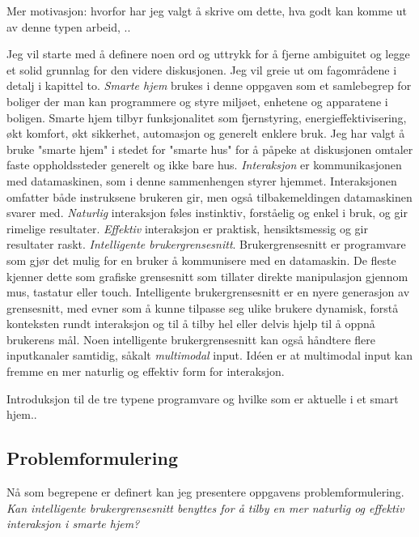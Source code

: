 {\color{red}Mer motivasjon: hvorfor har jeg valgt å skrive om dette, hva godt kan komme ut av denne typen arbeid, ..}

Jeg vil starte med å definere noen ord og uttrykk for å fjerne ambiguitet og legge et solid grunnlag for den videre diskusjonen. Jeg vil greie ut om fagområdene i detalj i kapittel to.
\newline\newline
\emph{Smarte hjem} brukes i denne oppgaven som et samlebegrep for boliger der man kan programmere og styre miljøet, enhetene og apparatene i boligen. Smarte hjem tilbyr funksjonalitet som fjernstyring, energieffektivisering, økt komfort, økt sikkerhet, automasjon og generelt enklere bruk. Jeg har valgt å bruke "smarte hjem" i stedet for "smarte hus" for å påpeke at diskusjonen omtaler faste oppholdssteder generelt og ikke bare hus. 
\newline\newline
\emph{Interaksjon} er kommunikasjonen med datamaskinen, som i denne sammenhengen styrer hjemmet. Interaksjonen omfatter både instruksene brukeren gir, men også tilbakemeldingen datamaskinen svarer med.
\newline\newline
\emph{Naturlig} interaksjon føles instinktiv, forståelig og enkel i bruk, og gir rimelige resultater.
\newline\newline
\emph{Effektiv} interaksjon er praktisk, hensiktsmessig og gir resultater raskt.
\newline\newline
\emph{Intelligente brukergrensesnitt}. Brukergrensesnitt er programvare som gjør det mulig for en bruker å kommunisere med en datamaskin. De fleste kjenner dette som grafiske grensesnitt som tillater direkte manipulasjon gjennom mus, tastatur eller touch. Intelligente brukergrensesnitt er en nyere generasjon av grensesnitt, med evner som å kunne tilpasse seg ulike brukere dynamisk, forstå konteksten rundt interaksjon og til å tilby hel eller delvis hjelp til å oppnå brukerens mål. Noen intelligente brukergrensesnitt kan også håndtere flere inputkanaler samtidig, såkalt \emph{multimodal} input. Idéen er at multimodal input kan fremme en mer naturlig og effektiv form for interaksjon.

{\color{red}Introduksjon til de tre typene programvare og hvilke som er aktuelle i et smart hjem..}
\citet{levold07} 

\subsection*{Problemformulering}
Nå som begrepene er definert kan jeg presentere oppgavens problemformulering.
\newline\newline
\emph{Kan intelligente brukergrensesnitt benyttes for å tilby en mer naturlig og effektiv interaksjon i smarte hjem?}

